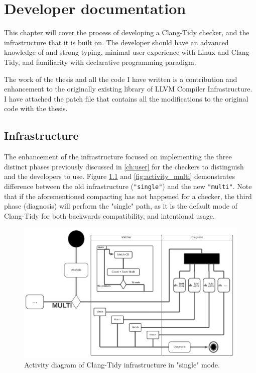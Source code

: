 \chapter{Developer documentation}
\label{ch:impl}

This chapter will cover the process of developing a Clang-Tidy checker, and the infrastructure that it is built on.
The developer should have an advanced knowledge of \CC{} and strong typing, minimal user experience with Linux and
Clang-Tidy, and familiarity with declarative programming paradigm.

The work of the thesis and all the code I have written is a contribution and enhancement to the originally existing library
of LLVM Compiler Infrastructure. I have attached the patch file that contains all the modifications to the original code
with the thesis.

\section{Infrastructure}
\label{sec:dev infra}

The enhancement of the infrastructure focused on implementing the three distinct phases previously discussed in \cref{ch:user}
for the checkers to distinguish and the developers to use.
Figure \cref{fig:activity_single} and \cref{fig:activity_multi} demonstrates difference between the old infrastructure
(\texttt{"single"}) and the new \texttt{"multi"}.
Note that if the aforementioned compacting has not happened for a checker, the third phase (diagnosis) will perform the "single"
path, as it is the default mode of Clang-Tidy for both backwards compatibility, and intentional usage.

\begin{figure}[H]
	\includegraphics[width=\linewidth]{images/activity_single.png}
	\caption{Activity diagram of Clang-Tidy infrastructure in "single" mode.}
	\label{fig:activity_single}
\end{figure}


